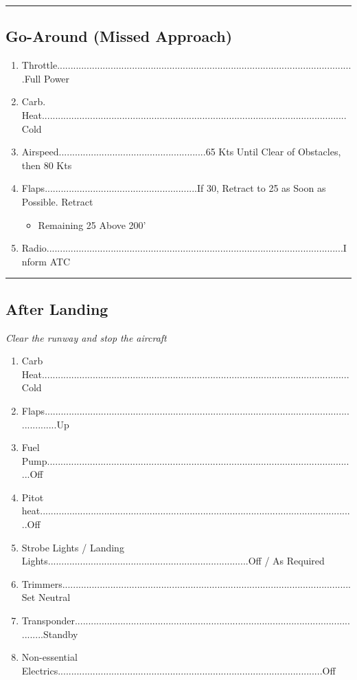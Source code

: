 \documentclass[a4paper]{article}
\newenvironment{checklist}{
  \begin{itemize}[leftmargin=*, align=left]
    \setlength{\itemsep}{2pt}
    \setlength{\parskip}{0pt}
    \setlength{\parsep}{0pt}
}{
  \end{itemize}
}
\newenvironment{numberedchecklist}{
  \begin{enumerate}[label=\arabic*., leftmargin=*, align=left]
    \setlength{\itemsep}{2pt}
    \setlength{\parskip}{0pt}
    \setlength{\parsep}{0pt}
}{
  \end{enumerate}
}
\begin{document}
\rule{\linewidth}{0.4pt}

\subsection*{Go-Around (Missed Approach)}
\begin{numberedchecklist}
\item Throttle...............................................................................................................Full Power
\item Carb. Heat..................................................................................................................Cold
\item Airspeed.......................................................65 Kts Until Clear of Obstacles, then 80 Kts
\item Flaps.........................................................If 30\textdegree{}, Retract to 25\textdegree{} as Soon as Possible. Retract
  \begin{checklist}
  \item Remaining 25\textdegree{} Above 200’
  \end{checklist}
\item Radio...............................................................................................................Inform ATC
\end{numberedchecklist}

\rule{\linewidth}{0.4pt}

\subsection*{After Landing}
\textit{Clear the runway and stop the aircraft}
\begin{numberedchecklist}
\item Carb Heat...................................................................................................................Cold
\item Flaps...............................................................................................................................Up
\item Fuel Pump....................................................................................................................Off
\item Pitot heat......................................................................................................................Off
\item Strobe Lights / Landing Lights...........................................................................Off / As Required
\item Trimmers............................................................................................................Set Neutral
\item Transponder...............................................................................................................Standby
\item Non-essential Electrics...................................................................................................Off
\end{numberedchecklist}
\end{document}
